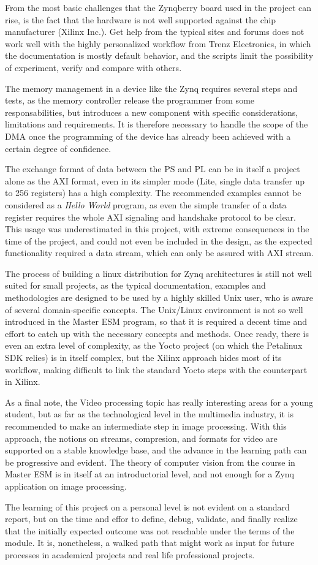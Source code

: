 From the most basic challenges that the Zynqberry board used in the project can rise, is the fact
that the hardware is not well supported against the chip manufacturer (Xilinx Inc.). Get help from
the typical sites and forums does not work well with the highly personalized workflow from Trenz
Electronics, in which the documentation is mostly default behavior, and the scripts limit the
possibility of experiment, verify and compare with others.

The memory management in a device like the Zynq requires several steps and tests, as the memory
controller release the programmer from some responsabilities, but introduces a new component with
specific considerations, limitations and requirements. It is therefore necessary to handle the scope
of the DMA once the programming of the device has already been achieved with a certain degree of
confidence.

The exchange format of data between the PS and PL can be in itself a project alone as the AXI
format, even in its simpler mode (Lite, single data transfer up to 256 registers) has a high
complexity. The recommended examples cannot be considered as a \textit{Hello World} program, as even
the simple transfer of a data register requires the whole AXI signaling and handshake protocol to be
clear. This usage was underestimated in this project, with extreme consequences in the time of the
project, and could not even be included in the design, as the expected functionality required a data
stream, which can only be assured with AXI stream.

The process of building a linux distribution for Zynq architectures is still not well suited for
small projects, as the typical documentation, examples and methodologies are designed to be used by
a highly skilled Unix user, who is aware of several domain-specific concepts. The Unix/Linux
environment is not so well introduced in the Master ESM program, so that it is required a decent
time and effort to catch up with the necessary concepts and methods. Once ready, there is even an
extra level of complexity, as the Yocto project (on which the Petalinux SDK relies) is in itself
complex, but the Xilinx approach hides most of its workflow, making difficult to link the standard
Yocto steps with the counterpart in Xilinx.

As a final note, the Video processing topic has really interesting areas for a young student, but
as far as the technological level in the multimedia industry, it is recommended to make an
intermediate step in image processing. With this approach, the notions on streams, compresion,
and formats for video are supported on a stable knowledge base, and the advance in the learning path
can be progressive and evident. The theory of computer vision from the course in Master ESM is in
itself at an introductorial level, and not enough for a Zynq application on image processing.

The learning of this project on a personal level is not evident on a standard report, but on the
time and effor to define, debug, validate, and finally realize that the initially expected outcome
was not reachable under the terms of the module. It is, nonetheless, a walked path that might work
as input for future processes in academical projects and real life professional projects.
